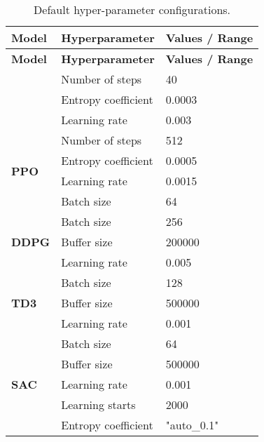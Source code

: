 \begin{longtable}{|l|l|p{8cm}|}
    \caption{Default hyper-parameter configurations.}
    \label{tab:default_hyperparameters}
    \\ 
    \hline
    \textbf{Model} & \textbf{Hyperparameter} & \textbf{Values / Range} \\ \midrule
    \endfirsthead

    \hline
    \textbf{Model} & \textbf{Hyperparameter} & \textbf{Values / Range} \\ \midrule
    \endhead

    \endfoot

    \multirow{3}{*}{\textbf{A2C}}
    & Number of steps & 40 \\
    & Entropy coefficient & 0.0003 \\ 
    & Learning rate & 0.003 \\ \hline


    \multirow{4}{*}{\textbf{PPO}}
    & Number of steps & 512 \\ 
    & Entropy coefficient & 0.0005 \\ 
    & Learning rate & 0.0015 \\ 
    & Batch size & 64 \\ \hline

    \multirow{3}{*}{\textbf{DDPG}}
    & Batch size & 256 \\ 
    & Buffer size & 200000 \\ 
    & Learning rate & 0.005 \\ \hline

    \multirow{3}{*}{\textbf{TD3}}
    & Batch size & 128 \\ 
    & Buffer size & 500000 \\ 
    & Learning rate & 0.001 \\ \hline

    \multirow{5}{*}{\textbf{SAC}}
    & Batch size & 64 \\ 
    & Buffer size & 500000 \\ 
    & Learning rate & 0.001 \\ 
    & Learning starts & 2000 \\ 
    & Entropy coefficient & "auto\_0.1" \\ \hline
\end{longtable}